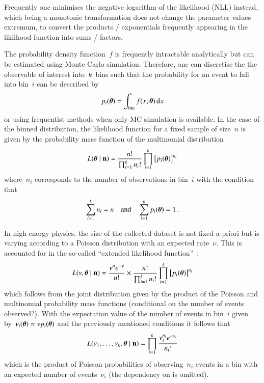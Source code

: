 Frequently one minimises the negative logarithm of the likelihood
(NLL) instead, which being a monotonic transformation does not change
the parameter values extremum, to convert the products / exponentials
frequently appearing in the liklihood function into sums / factors.


The probability density function~$f$ is frequently intractable
analytically but can be estimated using Monte Carlo
simulation. Therefore, one can discretise the the observable of
interest into~$k$~bins such that the probability for an event to fall
into bin~$i$ can be described by
\begin{align*}
  p_i(\boldsymbol{\theta}) = \int_\text{bin} f(x; \boldsymbol{\theta}) \, \mathrm{d}x
\end{align*}
or using frequentist methods when only MC simulation is available. In
the case of the binned distribution, the likelihood function for a
fixed sample of size~$n$ is given by the probability mass function of
the multinomial distribution
\begin{align*}
  L(\boldsymbol{\theta} \mid \mathbf{n}) = \frac{n!}{\prod_{i=1}^k n_i!} \prod_{i = 1}^k \left[ p_i(\boldsymbol{\theta}) \right]^{n_i}
\end{align*}
where~$n_i$ corresponds to the number of observations in bin~$i$ with
the condition that
\begin{align*}
  \sum_{i = 1}^k n_i = n \quad \text{and} \quad \sum_{i = 1}^k p_i(\boldsymbol{\theta}) = 1 \,\text{.}
\end{align*}

In high energy physics, the size of the collected dataset is not fixed
a priori but is varying according to a Poisson distribution with an
expected rate~$\nu$. This is accounted for in the so-called ``extended
likelihood function''~\cite{cowan1998}:
\begin{align*}
  L(\nu, \boldsymbol{\theta} \mid \mathbf{n}) =
  \frac{\nu^n e^{-\nu}}{n!} \times \frac{n!}
  {\prod_{i = 1}^k n_{i}!}
  \prod_{i = 1}^k \left[ p_i(\boldsymbol{\theta}) \right]^{n_i}
\end{align*}
which follows from the joint distribution given by the product of the
Poisson and multinomial probability mass functions (conditional on the
number of events observed?).  With the expectation value of the number
of events in bin~$i$ given
by~$\nu_i(\boldsymbol{\theta}) = \nu p_i(\boldsymbol{\theta})$ and the previously
mentioned conditions it follows that
\begin{align*}
  L(\nu_1, \dots, \nu_k, \boldsymbol{\theta} \mid \mathbf{n}) = \prod_{i = 1}^k \frac{\nu_i^{n_i} e^{-\nu_i}}{n_i!}
\end{align*}
which is the product of Poisson probabilities of observing~$n_i$
events in a bin with an expected number of events~$\nu_i$ (the
dependency on \boldtheta is omitted).

